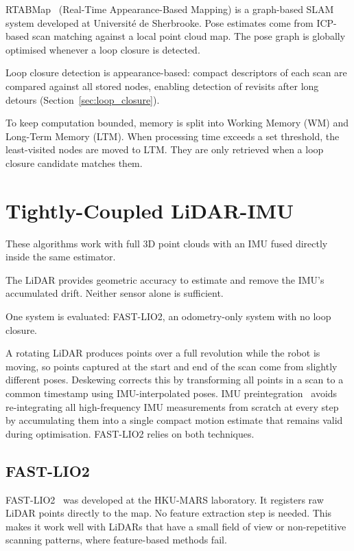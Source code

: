 RTABMap~\cite{labbe2019rtabmap} (Real-Time Appearance-Based Mapping) is a graph-based SLAM
system developed at Université de Sherbrooke. Pose estimates come from ICP-based scan
matching against a local point cloud map. The pose graph is globally optimised whenever
a loop closure is detected.

Loop closure detection is appearance-based: compact descriptors of each scan
are compared against all stored nodes, enabling detection of revisits after
long detours (Section~\ref{sec:loop_closure}).

To keep computation bounded, memory is split into Working Memory (WM) and Long-Term
Memory (LTM). When processing time exceeds a set threshold, the least-visited nodes
are moved to LTM. They are only retrieved when a loop closure candidate matches them.

\section{Tightly-Coupled LiDAR-IMU}

These algorithms work with full 3D point clouds with an IMU fused directly
inside the same estimator.

The LiDAR provides geometric accuracy to estimate and remove the IMU's accumulated drift.
Neither sensor alone is sufficient.

One system is evaluated: FAST-LIO2, an odometry-only system with no loop closure.

A rotating LiDAR produces points over a full revolution while the robot is
moving, so points captured at the start and end of the scan come from
slightly different poses.
Deskewing corrects this by transforming all points in a scan to a common
timestamp using IMU-interpolated poses.
IMU preintegration~\cite{forster2017manifold} avoids re-integrating all
high-frequency IMU measurements from scratch at every step by accumulating
them into a single compact motion estimate that remains valid during
optimisation.
FAST-LIO2 relies on both techniques.

\subsection{FAST-LIO2}

FAST-LIO2~\cite{xu2022fastlio2} was developed at the HKU-MARS laboratory. It
registers raw LiDAR points directly to the map. No feature extraction step is
needed. This makes it work well with LiDARs that have a small field of view or
non-repetitive scanning patterns, where feature-based methods fail.

